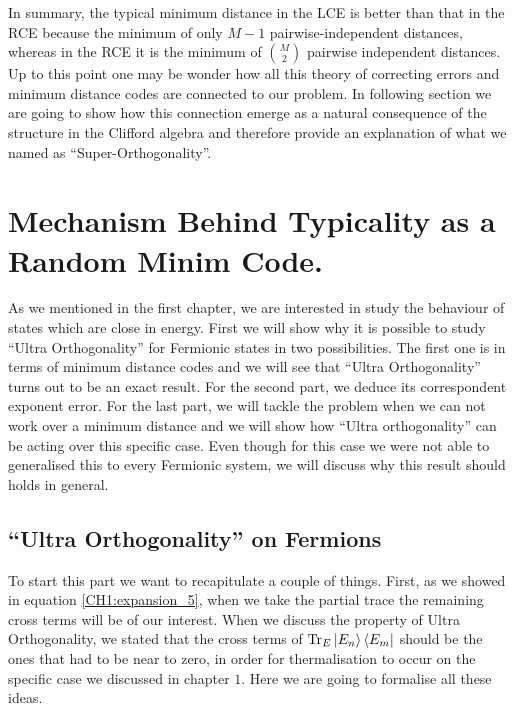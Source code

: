 \indent In summary, the typical minimum distance in the LCE is better than that in the RCE because the minimum of only $M-1$ pairwise-independent distances, whereas in the RCE it is the minimum of ${M\choose 2}$ pairwise independent distances.\\

\indent Up to this point one may be wonder how all this theory of correcting errors and minimum distance codes are connected to our problem. In following section we are going to show how this connection emerge as a natural consequence of the structure in the Clifford algebra and therefore provide an explanation of what we named as ``Super-Orthogonality''.
\section{Mechanism Behind Typicality as a Random Minim Code.}
As we mentioned in the first chapter, we are interested in study the behaviour of states which are close in energy. First we will show why it is possible to study ``Ultra Orthogonality'' for Fermionic states in two possibilities. The first one is in terms of minimum distance codes and we will see that ``Ultra Orthogonality'' turns out to be an exact result. For the second part, we deduce its correspondent exponent error. For the last part, we will tackle the problem when we can not work over a minimum distance and we will show how ``Ultra orthogonality'' can be acting over this specific case. Even though for this case we were not able to generalised this to every Fermionic system, we will discuss why this result should holds in general.

\subsection{``Ultra Orthogonality'' on Fermions}
To start this part we want to recapitulate a couple of things. First, as we showed in equation \eqref{CH1:expansion_5}, when we take the partial trace the remaining cross terms  will be of our interest. When we discuss the property of Ultra Orthogonality, we stated that the cross terms of $\operatorname{Tr}_{E}\mathinner{|{E_n}\rangle}\mathinner{\langle{E_m}|}$ should be the ones that had to be near to zero, in order for thermalisation to occur on the specific case we discussed in chapter $1$. Here we are going to formalise all these ideas.\\

